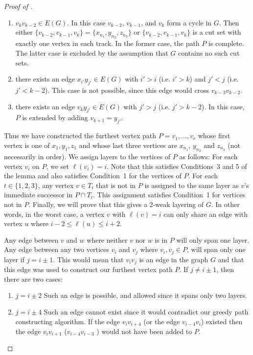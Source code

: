 \documentclass{patmorin}
\begin{document}
\begin{proof}[Proof of ]
  \begin{enumerate}
  \item $v_k v_{k-2}\in E(G)$.  In this
  case $v_{k-2}$, $v_{k-1}$, and $v_k$ form a cycle in $G$.  Then either
  $\{v_{k-2},v_{k-1},v_{k}\}=\{x_{n_1},y_{n_2},z_{n_3}\}$ or
  $\{v_{k-2},v_{k-1},v_{k}\}$ is a cut set with exactly one vertex in
  each track.  In the former case, the path $P$ is complete. The latter case is  excluded by the assumption that $G$ contains no such cut sets.

  \item there exists an edge $x_{i'}y_{j'}\in E(G)$ with $i' > i$
    (i.e. $i' > k$) and $j'< j$ (i.e. $j'< k-2$).  This case is not possible, since this edge would cross $v_{k-3}v_{k-2}$.

  \item there exists an edge $v_k y_{j'}\in E(G)$ with $j' >j$  (i.e. $j'> k-2$).  In this case, $P$ is extended by adding $v_{k+1}=y_{j'}$.
  \end{enumerate}


  Thus we have constructed the furthest vertex path $P=v_1,\ldots,v_r$ whose first vertex is one of
  $x_1,y_1,z_1$ and whose last three vertices are $x_{n_1}$,
  $y_{n_2}$ and $z_{n_3}$ (not necessarily in order).  We assign layers
  to the vertices of $P$ as follows: For each vertex $v_i$ on $P$,
  we set $\ell(v_i)=i$.  Note that this satisfies Conditions~3 and 5
  of the lemma and also satisfies Condition~1 for the vertices of $P$.
  For each $t\in\{1,2,3\}$, any vertex $v\in T_t$ that is not in
  $P$ is assigned to the same layer as $v$'s immediate successor in $P\cap T_t$.
  This assignment satisfies Condition~1 for vertices not in $P$.
  Finally, we will prove that this gives a 2-weak layering of $G$. In other words,
  in the worst case, a vertex $v$ with $\ell(v)=i$ can only share an edge with vertex $u$ where  $i-2 \le \ell(u) \le i+2$.

 Any edge between $v$ and $w$ where neither $v$ nor $w$ is in $P$ will only span one layer.
 Any edge between any two vertices $v_i$ and $v_j$ where $v_i, v_j \in P$, will span only one layer if $j = i\pm1$.
 This would mean that $v_{i}v_{j}$ is an edge in the graph $G$
 and that this edge was used to construct our furthest vertex path $P$.
 If $j \neq i\pm1$, then there are two cases:
   \begin{enumerate}
	\item $j = i \pm 2$ Such an edge is possible, and allowed since it spans only two layers. %
	\item $j = i \pm 4$ Such an edge cannot exist since it would contradict our greedy path constructing algorithm.
	If the edge $v_iv_{i+4}$ (or the edge $v_{i-4}v_i$) existed then the edge $v_i v_{i+1}$ ($v_{i-4}v_{i-3}$ ) would not have been added to $P$.
   \end{enumerate}


\end{proof}
\end{document}
